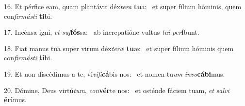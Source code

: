 16. Et pérfice eam, quam plantávit déx\textit{te}\textit{ra} \textbf{tu}a: \ast\  et super fílium hóminis, quem con\textit{fir}\textit{más}\textit{ti} \textbf{ti}bi.\

17. Incénsa igni, \textit{et} \textit{suf}\textbf{fós}sa: \ast\  ab increpatióne vultus \textit{tu}\textit{i} \textit{per}\textbf{í}bunt.\

18. Fiat manus tua super virum déx\textit{te}\textit{ræ} \textbf{tu}æ: \ast\  et super fílium hóminis quem con\textit{fir}\textit{más}\textit{ti} \textbf{ti}bi.\

19. Et non discédimus a te, vi\textit{vi}\textit{fi}\textbf{cá}bis nos: \ast\  et nomen tu\textit{um} \textit{in}\textit{vo}\textbf{cá}\textbf{bi}mus.\

20. Dómine, Deus virtú\textit{tum}, \textit{con}\textbf{vér}te nos: \ast\  et osténde fáciem tuam, \textit{et} \textit{sal}\textit{vi} \textbf{é}\textbf{ri}mus.\


